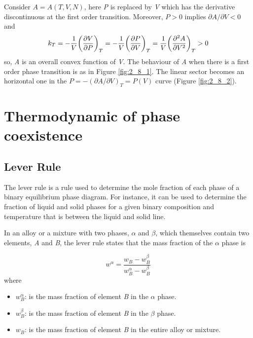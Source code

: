 \documentclass[../../Main/Main.tex]{subfiles}
\begin{document}
Consider \( A = A (T,V,N) \), here  \emph{P} is replaced by \emph{V} which has the derivative discontinuous at the first order transition. Moreover, \( P > 0 \)  implies \( \partial{A}/\partial{V} < 0   \) and
\begin{equation}
  k_T = -\frac{1}{V} \qty(\pdv{V}{P} )_T = -\frac{1}{V} \qty(\pdv{P}{V} )_T = \frac{1}{V} \qty(\pdv[2]{A}{V} )_T > 0
  \label{eq:}
\end{equation}
so, \emph{A} is an overall convex function of \emph{V}.
The behaviour of \emph{A} when there is a first order phase transition is as in Figure \ref{fig:2_8_1}. The linear sector becomes an horizontal one in the \( P = - (\partial{A}/\partial{V}  )_T = P (V) \) curve (Figure \ref{fig:2_8_2}).







\section{Thermodynamic of phase coexistence}

\subsection{Lever Rule}

The lever rule is a rule used to determine the mole fraction of each phase of a binary equilibrium phase diagram. For instance, it can be used to determine the fraction of liquid and solid phases for a given binary composition and temperature that is between the liquid and solid line.

In an alloy or a mixture with two phases, \( \alpha  \)  and \( \beta  \), which themselves contain two elements, \emph{A}  and \emph{B}, the lever rule states that the mass fraction of the \( \alpha  \)  phase is

\begin{equation}
w^{\alpha } = \frac{w_B - w_B^\beta }{w_B^\alpha - w_B^\beta }
\end{equation}
where
\begin{itemize}
\item \( w_B^\alpha  \):  is the mass fraction of element \emph{B}  in the \( \alpha  \) phase.
\item \( w_B^\beta   \):  is the mass fraction of element \emph{B} in the \( \beta  \)  phase.
\item \( w_B  \):  is the mass fraction of element \emph{B} in the entire alloy or mixture.
\end{itemize}
\end{document}
